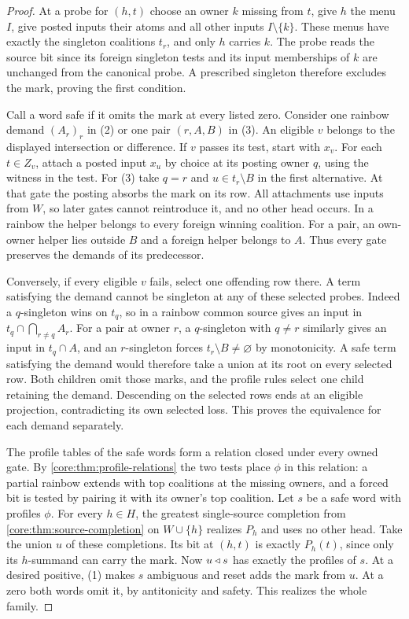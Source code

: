 \begin{proof}
At a probe for $(h,t)$ choose an owner $k$ missing from $t$, give $h$
the menu $I$, give posted inputs their atoms and all other inputs
$I\setminus\{k\}$. These menus have exactly the singleton coalitions
$t_r$, and only $h$ carries $k$. The probe reads the source bit since
its foreign singleton tests and its input memberships of $k$ are
unchanged from the canonical probe. A prescribed singleton therefore
excludes the mark, proving the first condition.

Call a word safe if it omits the mark at every listed zero. Consider
one rainbow demand $(A_r)_r$ in (2) or one pair $(r,A,B)$ in (3).
An eligible $v$ belongs to the displayed intersection or difference.
If $v$ passes its test, start with $x_v$. For each $t\in Z_v$, attach
a posted input $x_u$ by choice at its posting owner $q$, using the
witness in the test. For (3) take $q=r$ and $u\in t_r\setminus B$
in the first alternative. At that gate the posting absorbs the mark
on its row. All attachments use inputs from $W$, so later gates
cannot reintroduce it, and no other head occurs. In a rainbow the
helper belongs to every foreign winning coalition. For a pair, an
own-owner helper lies outside $B$ and a foreign helper belongs to
$A$. Thus every gate preserves the demands of its predecessor.

Conversely, if every eligible $v$ fails, select one offending row
there. A term satisfying the demand cannot be singleton at any of
these selected probes. Indeed a $q$-singleton wins on $t_q$, so in
a rainbow common source gives an input in
$t_q\cap\bigcap_{r\ne q} A_r$. For a pair at owner $r$, a
$q$-singleton with $q\ne r$ similarly gives an input in $t_q\cap A$,
and an $r$-singleton forces $t_r\setminus B\ne\varnothing$ by
monotonicity. A safe term satisfying the demand would therefore take
a union at its root on every selected row. Both children omit those
marks, and the profile rules select one child retaining the demand.
Descending on the selected rows ends at an eligible projection,
contradicting its own selected loss. This proves the equivalence for
each demand separately.

The profile tables of the safe words form a relation closed under
every owned gate. By \cref{core:thm:profile-relations} the two tests
place $\phi$ in this relation: a partial rainbow extends with top
coalitions at the missing owners, and a forced bit is tested by
pairing it with its owner's top coalition. Let $s$ be a safe word
with profiles $\phi$. For every $h\in H$, the greatest single-source
completion from \cref{core:thm:source-completion} on $W\cup\{h\}$
realizes $P_h$ and uses no other head. Take the union $u$ of these
completions. Its bit at $(h,t)$ is exactly $P_h(t)$, since only its
$h$-summand can carry the mark. Now $u\mathbin{\triangleleft} s$ has exactly the
profiles of $s$. At a desired positive, (1) makes $s$ ambiguous and
reset adds the mark from $u$. At a zero both words omit it, by
antitonicity and safety. This realizes the whole family.
\end{proof}

